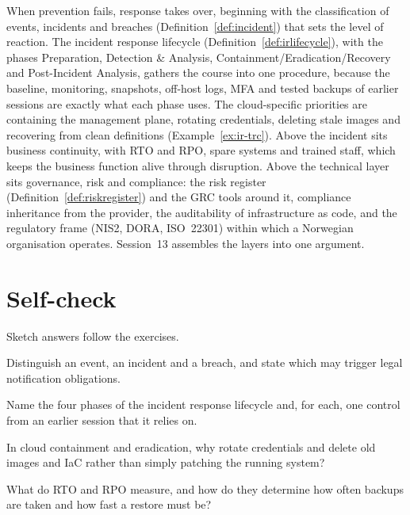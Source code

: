 When prevention fails, response takes over, beginning with the
classification of events, incidents and breaches
(Definition~\ref{def:incident}) that sets the level of reaction. The
incident response lifecycle (Definition~\ref{def:irlifecycle}), with the
phases Preparation, Detection \& Analysis, Containment/Eradication/Recovery
and Post-Incident Analysis, gathers the course into one procedure, because
the baseline, monitoring, snapshots, off-host logs, MFA and tested backups
of earlier sessions are exactly what each phase uses. The cloud-specific
priorities are containing the management plane, rotating credentials,
deleting stale images and recovering from clean definitions
(Example~\ref{ex:ir-trc}). Above the incident sits business continuity, with
RTO and RPO, spare systems and trained staff, which keeps the business
function alive through disruption. Above the technical layer sits
governance, risk and compliance: the risk register
(Definition~\ref{def:riskregister}) and the GRC tools around it, compliance
inheritance from the provider, the auditability of infrastructure as code,
and the regulatory frame (NIS2, DORA, ISO~22301) within which a Norwegian
organisation operates. Session~13 assembles the layers into one argument.

\section*{Self-check}

Sketch answers follow the exercises.

\begin{exercise}
Distinguish an event, an incident and a breach, and state which may trigger
legal notification obligations.
\end{exercise}

\begin{exercise}
Name the four phases of the incident response lifecycle and, for each, one
control from an earlier session that it relies on.
\end{exercise}

\begin{exercise}
In cloud containment and eradication, why rotate credentials and delete old
images and IaC rather than simply patching the running system?
\end{exercise}

\begin{exercise}
What do RTO and RPO measure, and how do they determine how often backups are
taken and how fast a restore must be?
\end{exercise}

